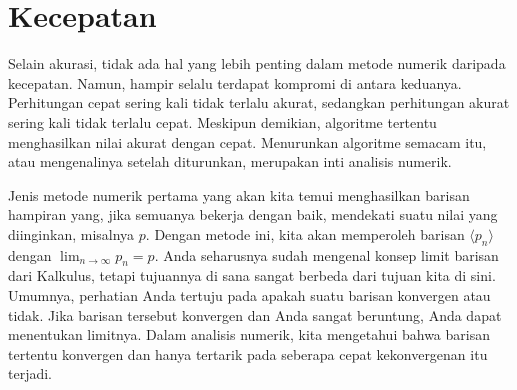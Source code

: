 
\section{\label{sec:Speed}Kecepatan}

Selain akurasi, tidak ada hal yang lebih penting dalam metode numerik
daripada kecepatan. Namun, hampir selalu terdapat kompromi di antara
keduanya. Perhitungan cepat sering kali tidak terlalu akurat, sedangkan
perhitungan akurat sering kali tidak terlalu cepat. Meskipun demikian,
algoritme tertentu menghasilkan nilai akurat dengan cepat. Menurunkan
algoritme semacam itu, atau mengenalinya setelah diturunkan, merupakan
inti analisis numerik.

Jenis metode numerik pertama yang akan kita temui menghasilkan barisan
hampiran yang, jika semuanya bekerja dengan baik, mendekati suatu
nilai yang diinginkan, misalnya $p$. Dengan metode ini, kita akan
memperoleh barisan $\langle p_{n}\rangle$ dengan $\lim_{n\to\infty}p_{n}=p$.
Anda seharusnya sudah mengenal konsep limit barisan dari Kalkulus,
tetapi tujuannya di sana sangat berbeda dari tujuan kita di sini.
Umumnya, perhatian Anda tertuju pada apakah suatu barisan konvergen
atau tidak. Jika barisan tersebut konvergen dan Anda sangat beruntung,
Anda dapat menentukan limitnya. Dalam analisis numerik, kita mengetahui
bahwa barisan tertentu konvergen dan hanya tertarik pada seberapa
cepat kekonvergenan itu terjadi. 

